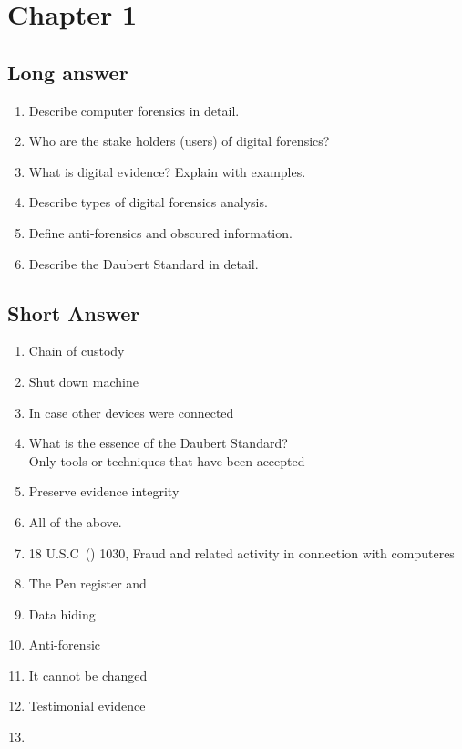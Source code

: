 \section{Chapter 1}
\subsection{Long answer}
\begin{enumerate}
    \item Describe computer forensics in detail.
    \item Who are the stake holders (users) of digital forensics?
    \item What is digital evidence? Explain with examples.
    \item Describe types of digital forensics analysis.
    \item Define anti-forensics and obscured information.
    \item Describe the Daubert Standard in detail.
\end{enumerate}

\subsection{Short Answer}
\begin{enumerate}
    \item Chain of custody
    \item Shut down machine
    \item In case other devices were connected
    \item What is the essence of the Daubert Standard?\\Only tools or techniques that have been accepted
    \item Preserve evidence integrity
    \item All of the above.
    \item 18 U.S.C\ () 1030, Fraud and related activity in connection with computeres
    \item The Pen register and 
    \item Data hiding
    \item Anti-forensic
    \item It cannot be changed
    \item Testimonial evidence
    \item 
\end{enumerate}